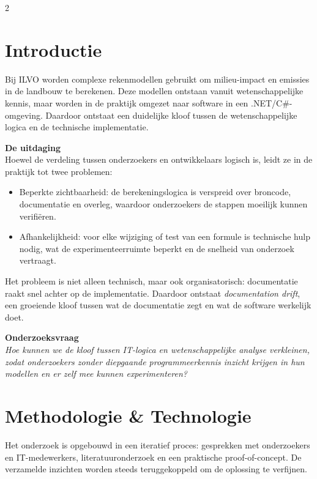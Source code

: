 \documentclass[a0,portrait]{hogent-poster}
\begin{document}
\begin{multicols}{2} %

\section{Introductie}

Bij ILVO worden complexe rekenmodellen gebruikt om milieu-impact en emissies in de landbouw te berekenen. 
Deze modellen ontstaan vanuit wetenschappelijke kennis, maar worden in de praktijk omgezet naar software in een .NET/C\#-omgeving. 
Daardoor ontstaat een duidelijke kloof tussen de wetenschappelijke logica en de technische implementatie.

\textbf{De uitdaging} \\
Hoewel de verdeling tussen onderzoekers en ontwikkelaars logisch is, leidt ze in de praktijk tot twee problemen:
\begin{itemize}
    \item Beperkte zichtbaarheid: de berekeningslogica is verspreid over broncode, documentatie en overleg, waardoor onderzoekers de stappen moeilijk kunnen verifiëren.
    \item Afhankelijkheid: voor elke wijziging of test van een formule is technische hulp nodig, wat de experimenteerruimte beperkt en de snelheid van onderzoek vertraagt.
\end{itemize}

Het probleem is niet alleen technisch, maar ook organisatorisch: documentatie raakt snel achter op de implementatie. 
Daardoor ontstaat \emph{documentation drift}, een groeiende kloof tussen wat de documentatie zegt en wat de software werkelijk doet.

\textbf{Onderzoeksvraag} \\
\textit{Hoe kunnen we de kloof tussen IT-logica en wetenschappelijke analyse verkleinen, zodat onderzoekers zonder diepgaande programmeerkennis inzicht krijgen in hun modellen en er zelf mee kunnen experimenteren?}

\section{Methodologie \& Technologie}

Het onderzoek is opgebouwd in een iteratief proces: gesprekken met onderzoekers en IT-medewerkers, literatuuronderzoek en een praktische proof-of-concept. 
De verzamelde inzichten worden steeds teruggekoppeld om de oplossing te verfijnen.


\end{multicols}
\end{document}
